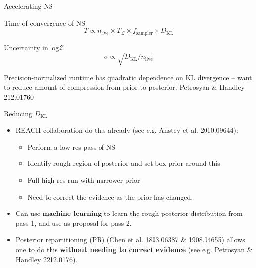 \documentclass[aspectratio=169]{beamer}
\begin{document}
\begin{frame}{Accelerating NS}

\begin{block}{Time of convergence of NS}
    \begin{equation}
        T \propto n_{\textrm{live}} \times T_{\mathcal{L}} \times f_{\textrm{sampler}} \times D_{\textrm{KL}}
    \end{equation}
\end{block}

\begin{block}{Uncertainty in log$\mathcal{Z}$}
    \begin{equation}
        \sigma \propto \sqrt{D_{\textrm{KL}} / n_{\textrm{live}}}
    \end{equation}
\end{block}

\alert{Precision-normalized} runtime has quadratic dependence on KL divergence -- want to reduce amount of compression from prior to posterior. \textcolor{cfgrey}{Petrosyan \& Handley 212.01760}
    
\end{frame}

\begin{frame}{Reducing $D_{\textrm{KL}}$}

\begin{itemize}
    \item<1-> REACH collaboration do this already (see e.g. \textcolor{cfgrey}{Anstey et al. 2010.09644}):
        \begin{itemize}
            \item Perform a low-res pass of NS
            \item Identify rough region of posterior and set box prior around this
            \item Full high-res run with narrower prior
            \item Need to correct the evidence as the prior has changed. 
        \end{itemize}

    \item<2-> Can use \textbf{machine learning} to learn the rough posterior distribution from pass 1, and use as proposal for pass 2. 

    \item<3-> \alert{Posterior repartitioning (PR)} (\textcolor{cfgrey}{Chen et al. 1803.06387 \& 1908.04655}) allows one to do this \textbf{without needing to correct evidence} (see e.g. \textcolor{cfgrey}{Petrosyan \& Handley 2212.0176}).

\end{itemize}
\end{frame}
\end{document}
